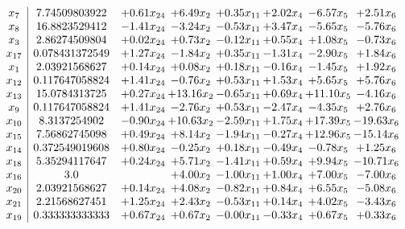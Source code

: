 \documentclass[8pt]{article}
\begin{document}
\[\begin{array}{c| c c@{\hskip 2pt} c@{\hskip 2pt} c@{\hskip 2pt} c@{\hskip 2pt} c@{\hskip 2pt} c@{\hskip 2pt} }
 x_{7}   &  7.74509803922 & +  0.61 x_{24} & +  6.49 x_{2} & +  0.35 x_{11} & +  2.02 x_{4} & -6.57 x_{5} & +  2.51 x_{6}\\
 x_{8}   &  16.8823529412 & -1.41 x_{24} & -3.24 x_{2} & -0.53 x_{11} & +  3.47 x_{4} & -5.65 x_{5} & -5.76 x_{6}\\
 x_{3}   &  2.86274509804 & +  0.02 x_{24} & +  0.73 x_{2} & -0.12 x_{11} & +  0.55 x_{4} & +  1.08 x_{5} & -0.73 x_{6}\\
 x_{17}   &  0.078431372549 & +  1.27 x_{24} & -1.84 x_{2} & +  0.35 x_{11} & -1.31 x_{4} & -2.90 x_{5} & +  1.84 x_{6}\\
 x_{1}   &  2.03921568627 & +  0.14 x_{24} & +  0.08 x_{2} & +  0.18 x_{11} & -0.16 x_{4} & -1.45 x_{5} & +  1.92 x_{6}\\
 x_{12}   &  0.117647058824 & +  1.41 x_{24} & -0.76 x_{2} & +  0.53 x_{11} & +  1.53 x_{4} & +  5.65 x_{5} & +  5.76 x_{6}\\
 x_{13}   &  15.0784313725 & +  0.27 x_{24} & + 13.16 x_{2} & -0.65 x_{11} & +  0.69 x_{4} & + 11.10 x_{5} & -4.16 x_{6}\\
 x_{9}   &  0.117647058824 & +  1.41 x_{24} & -2.76 x_{2} & +  0.53 x_{11} & -2.47 x_{4} & -4.35 x_{5} & +  2.76 x_{6}\\
 x_{10}   &  8.3137254902 & -0.90 x_{24} & + 10.63 x_{2} & -2.59 x_{11} & +  1.75 x_{4} & + 17.39 x_{5} & -19.63 x_{6}\\
 x_{15}   &  7.56862745098 & +  0.49 x_{24} & +  8.14 x_{2} & -1.94 x_{11} & -0.27 x_{4} & + 12.96 x_{5} & -15.14 x_{6}\\
 x_{14}   &  0.372549019608 & +  0.80 x_{24} & -0.25 x_{2} & +  0.18 x_{11} & -0.49 x_{4} & -0.78 x_{5} & +  1.25 x_{6}\\
 x_{18}   &  5.35294117647 & +  0.24 x_{24} & +  5.71 x_{2} & -1.41 x_{11} & +  0.59 x_{4} & +  9.94 x_{5} & -10.71 x_{6}\\
 x_{16}   &  3.0  &   & +  4.00 x_{2} & -1.00 x_{11} & +  1.00 x_{4} & +  7.00 x_{5} & -7.00 x_{6}\\
 x_{20}   &  2.03921568627 & +  0.14 x_{24} & +  4.08 x_{2} & -0.82 x_{11} & +  0.84 x_{4} & +  6.55 x_{5} & -5.08 x_{6}\\
 x_{21}   &  2.21568627451 & +  1.25 x_{24} & +  2.43 x_{2} & -0.53 x_{11} & +  0.14 x_{4} & +  4.02 x_{5} & -3.43 x_{6}\\
 x_{19}   &  0.333333333333 & +  0.67 x_{24} & +  0.67 x_{2} & -0.00 x_{11} & -0.33 x_{4} & +  0.67 x_{5} & +  0.33 x_{6}\\

\end{array}\]
\end{document}
